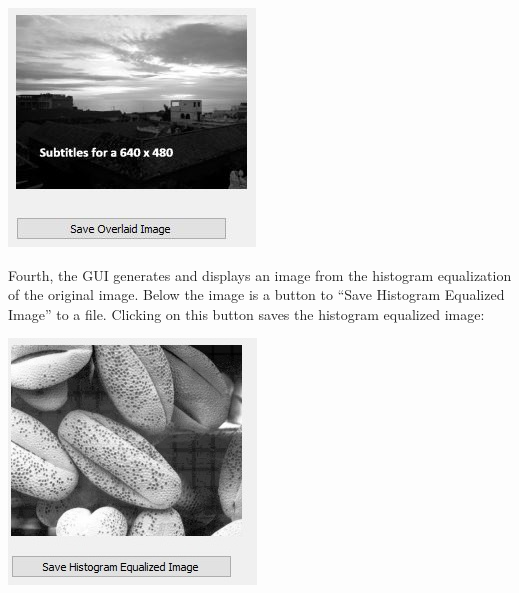 \documentclass{article}
\newenvironment{Figure}
  {\par\medskip\noindent\ignorespaces\minipage{\linewidth}}
  {\endminipage\par\medskip}
\begin{document}
\begin{multicols*}{2}
\begin{Figure}
 \centering
 \includegraphics[width=\linewidth]{OverlaidImage2.jpg}
\end{Figure}

Fourth, the GUI generates and displays an image from the histogram equalization of the original image. Below the image is a button to “Save Histogram Equalized Image” to a file. Clicking on this button saves the histogram equalized image:


\begin{Figure}
 \centering
 \includegraphics[width=\linewidth]{HistogramEqualizedImage.jpg}
\end{Figure}


\end{multicols*}
\end{document}
